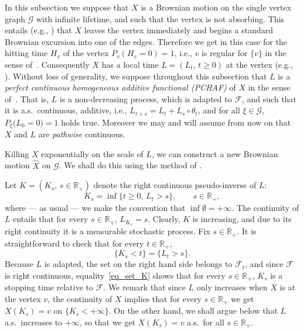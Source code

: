 \documentclass[11pt,a4paper]{amsart}
\newcommand{\cF}{\mathcal{F}}
\newcommand{\cG}{\mathcal{G}}
\newcommand{\1}{1}
\newcommand{\R}{\mathbb{R}}
\theoremstyle{remark}
\let\comp\circ
\newcommand{\hX}{\ensuremath{\hat X}}
\numberwithin{equation}{section}
\begin{document}
In this subsection we suppose that $X$ is a Brownian motion on the single vertex
graph $\cG$ with infinite lifetime, and such that the vertex is not absorbing. This
entails (e.g., \cite[Proposition~II.2.19]{ReYo91}) that $X$ leaves the vertex immediately and
begins a standard Brownian excursion into one of the edges. Therefore we get in this
case for the hitting time $H_v$ of the vertex $P_v(H_v=0)=1$, i.e., $v$ is regular
for $\{v\}$ in the sense of~\cite{BlGe68}. Consequently $X$ has a local time
$L=(L_t,\,t\ge 0)$ at the vertex (e.g., \cite[Theorem~V.3.13]{BlGe68}). Without loss
of generality, we suppose throughout this subsection that $L$ is a \emph{perfect
continuous homogeneous additive functional (PCHAF)} of $X$ in the sense
of~\cite[Section~III.32]{Wi79}. That is, $L$ is a non-decreasing process, which is
adapted to $\cF$, and such that it is a.s.\ continuous, additive, i.e., $L_{t+s} =
L_t + L_s\comp \theta_t$, and for all $\xi\in\cG$, $P_\xi\bigl(L_0=0\bigr)=1$ holds
true. Moreover we may and will assume from now on that $X$ and $L$ are
\emph{pathwise} continuous.

Killing $X$ exponentially on the scale of $L$, we can construct a new Brownian
motion $\hX$ on $\cG$.  We shall do this using the method of \cite{Kn81, KaSh91}.

Let $K=(K_s,\,s\in\R_+)$ denote the right continuous pseudo-inverse of $L$:
\begin{equation}    \label{eq_def_K}
    K_s = \inf\{t\ge 0,\,L_t>s\},\qquad s\in\R_+,
\end{equation}
where --- as usual --- we make the convention that $\inf\emptyset=+\infty$. The
continuity of $L$ entails that for every $s\in\R_+$, $L_{K_s}=s$. Clearly, $K$ is
increasing, and due to its right continuity it is a measurable stochastic process.
Fix $s\in\R_+$. It is straightforward to check that for every $t\in\R_+$,
\begin{equation}    \label{eq_set_K}
    \{K_s < t\} = \{L_t > s\}.
\end{equation}
Because $L$ is adapted, the set on the right hand side belongs to $\cF_t$, and since
$\cF$ is right continuous, equality~\eqref{eq_set_K} shows that for every $s\in\R_+$,
$K_s$ is a stopping time relative to $\cF$. We remark that since $L$ only increases
when $X$ is at the vertex $v$, the continuity of $X$ implies that for every
$s\in\R_+$ we get $X(K_s) = v$ on $\{K_s<+\infty\}$. On the other hand, we shall
argue below that $L$ a.s.\ increases to $+\infty$, so that we get $X(K_s)=v$
a.s.\ for all $s\in\R_+$.
\end{document}
